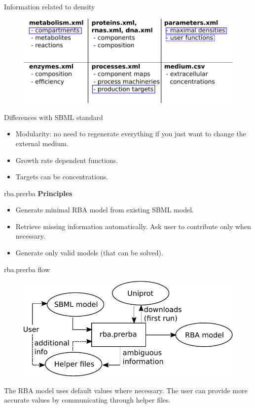 \documentclass{beamer}
\begin{document}
\begin{frame}{Information related to density}
  \begin{figure}[!ht]
    \centering
    \includegraphics[width=\linewidth]{xml_density_constraints}
  \end{figure}
\end{frame}

\begin{frame}{Differences with SBML standard}
  \begin{itemize}
    \item Modularity: no need to regenerate everything if you just want
    to change the external medium.
    \item Growth rate dependent functions.
    \item Targets can be concentrations.
  \end{itemize}
\end{frame}

\begin{frame}{rba.prerba}
  \textbf{Principles}
  \begin{itemize}
    \item Generate minimal RBA model from existing SBML model.
    \item Retrieve missing information automatically. Ask user to contribute
    only when necessary.
    \item Generate only valid models (that can be solved).
  \end{itemize}
\end{frame}

\begin{frame}{rba.prerba flow}
  \begin{figure}[!ht]
    \centering
    \includegraphics[width=\linewidth]{prerba_summary}
  \end{figure}
  The RBA model uses default values where necessary.
  The user can provide more accurate values by communicating through
  helper files.
\end{frame}
\end{document}
